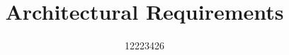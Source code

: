 \documentclass[11pt,a4paper]{article}
\begin{document}
\begin{titlepage}
\title{Architectural Requirements}
\author{12223426}
\maketitle
\end{titlepage}

 
\end{document}
